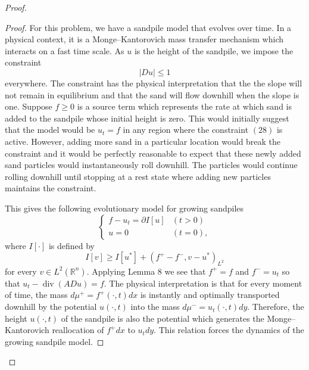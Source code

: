 \documentclass{article}
\begin{document}
\begin{flushleft}
\begin{proof}
\begin{proof}
For this problem, we have a sandpile model that evolves over time. In a physical context, it is a Monge–Kantorovich mass transfer mechanism which interacts on a fast time scale. As $u$ is the height of the sandpile, we impose the constraint 
\begin{equation}|Du| \leq 1\end{equation}
everywhere. The constraint has the physical interpretation that the the slope will not remain in equilibrium and that the sand will flow downhill when the slope is one. Suppose $f\geq 0$ is a source term which represents the rate at which sand is added to the sandpile whose initial height is zero. This would initially suggest that the model would be $u_t=f$ in any region where the constraint $(28)$ is active. However, adding more sand in a particular location would break the constraint and it would be perfectly reasonable to expect that these newly added sand particles would instantaneously roll downhill. The particles would continue rolling downhill until stopping at a rest state where adding new particles maintains the constraint.

This gives the following evolutionary model for growing sandpiles
$$
  \begin{cases} 
      f-u_t = \partial I[u] & (t>0) \\
      u = 0 & (t=0),
   \end{cases}
$$
where $I[\cdot]$ is defined by
$$I[v] \geq I[u^*] + (f^+ - f^-, v-u^*)_{L^2}$$
for every $v\in L^2(\mathbb R^n)$. Applying Lemma $8$ we see that $f^+ = f$ and $f^- = u_t$ so that $u_t - \operatorname{div}(ADu)=f$. The physical interpretation is that for every moment of time, the mass $d\mu^+ = f^+(\cdot,t)dx$ is instantly and optimally transported downhill by the potential $u(\cdot,t)$ into the mass $d\mu^- = u_t(\cdot,t)dy$. Therefore, the height $u(\cdot,t)$ of the sandpile is also the potential which generates the Monge–Kantorovich reallocation of $f^+dx $ to $u_tdy$. This relation forces the dynamics of the growing sandpile model. 


\end{proof}
\end{proof}
\end{flushleft}
\end{document}
